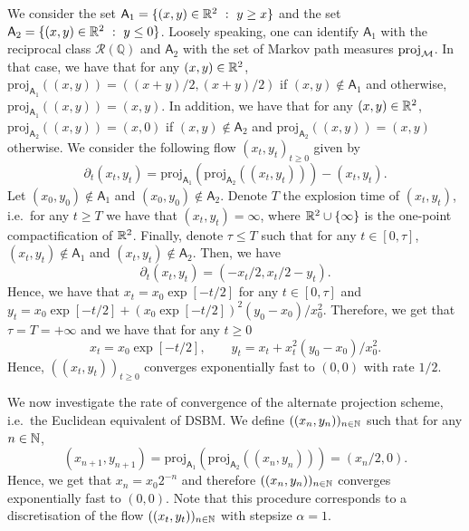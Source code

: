 \documentclass{article}
\begin{document}
We consider the set $\mathsf{A}_1 = \{ (x,y) \in \mathbb{R}^2 \ : \ y \ge x \}$ and the set $\mathsf{A}_2 = \{ (x,y) \in \mathbb{R}^2 \ : \ y \leq 0 \}$. Loosely  speaking, one can identify $\mathsf{A}_1$ with the reciprocal class $\mathcal{R}(\mathbb{Q})$ and $\mathsf{A}_2$ with the set of Markov path measures $\mathrm{proj}_{\mathcal{M}}$. In that case, we have that for any $(x,y) \in \mathbb{R}^2$, $\mathrm{proj}_{\mathsf{A}_1}((x,y)) = ((x+y)/2,(x+y)/2)$ if $(x,y) \notin \mathsf{A}_1$ and otherwise, $\mathrm{proj}_{\mathsf{A}_1}((x,y)) = (x,y)$. In addition, we have that for any $(x,y) \in \mathbb{R}^2$, $\mathrm{proj}_{\mathsf{A}_2}((x,y)) = (x,0)$ if $(x,y) \notin \mathsf{A}_2$ and $\mathrm{proj}_{\mathsf{A}_2}((x,y)) = (x,y)$ otherwise. We consider the following flow $(x_t,y_t)_{t \geq 0}$ given by 
\begin{equation}
    \partial_t (x_t,y_t) = \mathrm{proj}_{\mathsf{A}_1}(\mathrm{proj}_{\mathsf{A}_2}((x_t,y_t))) - (x_t,y_t) . 
\end{equation}
Let $(x_0,y_0) \notin \mathsf{A}_1$ and $(x_0,y_0) \notin \mathsf{A}_2$. Denote $T$ the explosion time of $(x_t,y_t)$, i.e.~for any $t \geq T$ we have that $(x_t,y_t) = \infty$, where $\mathbb{R}^2 \cup \{ \infty \}$ is the one-point compactification of $\mathbb{R}^2$. Finally, denote $\tau \leq T$ such that for any $t \in [0, \tau]$, $(x_t, y_t) \not \in \mathsf{A}_1$ and $(x_t, y_t) \not \in \mathsf{A}_2$. Then, we have 
\begin{equation}
    \partial_t (x_t,y_t) = (-x_t/2, x_t/2 - y_t) . 
\end{equation}
Hence, we have that $x_t = x_0 \exp[-t/2]$ for any $t \in [0, \tau]$ and $y_t = x_0 \exp[-t/2] + (x_0 \exp[-t/2])^2 (y_0 - x_0)/x_0^2 $. Therefore, we get that $\tau = T = +\infty$ and we have that for any $t \geq 0$
\begin{equation}
    x_t = x_0 \exp[-t/2] , \qquad y_t = x_t +x_t^2 (y_0 - x_0)/x_0^2  . 
\end{equation}
Hence, $((x_t, y_t))_{t \geq 0}$ converges exponentially fast to $(0,0)$ with rate $1/2$. 

We now investigate the rate of convergence of the alternate projection scheme, i.e.~the Euclidean equivalent of DSBM. 
We define $((x_n, y_n))_{n \in \mathbb{N}}$ such that for any $n \in \mathbb{N}$, 
\begin{equation}
    (x_{n+1}, y_{n+1}) = \mathrm{proj}_{\mathsf{A}_1}(\mathrm{proj}_{\mathsf{A}_2}((x_n,y_n))) = (x_n/2, 0) . 
\end{equation}
Hence, we get that $x_n = x_0 2^{-n}$ and therefore $((x_n, y_n))_{n \in \mathbb{N}}$ converges exponentially fast to $(0,0)$. Note that this procedure corresponds to a discretisation of the flow $((x_t, y_t))_{n \in \mathbb{N}}$ with stepsize $\alpha =1 $. 
\end{document}
